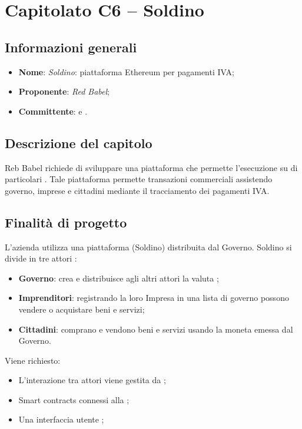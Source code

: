 \section{Capitolato C6 – Soldino}

\subsection{Informazioni generali}
% 
\begin{itemize}
\item \textbf{Nome}: \textit{Soldino}: piattaforma Ethereum per pagamenti IVA;\phantom{.}
\item \textbf{Proponente}: \textit{Red Babel};\phantom{.}
\item \textbf{Committente}: \commitNameM\mbox{} e \commitNameS.
\end{itemize}

\subsection{Descrizione del capitolo}
Reb Babel richiede di sviluppare una piattaforma che permette l'esecuzione su  di particolari .
Tale piattaforma permette transazioni commerciali assistendo governo, imprese e cittadini mediante il tracciamento dei pagamenti IVA.


\subsection{Finalità di progetto}
    L'azienda utilizza una piattaforma (Soldino) distribuita dal Governo.
    Soldino si divide in tre attori :
    \begin{itemize}
        \item \textbf{Governo}: crea e distribuisce agli altri attori la valuta ;\phantom{.}
        \item \textbf{Imprenditori}: registrando la loro Impresa in una lista di governo possono vendere o acquistare beni e servizi; \phantom{.}
        \item \textbf{Cittadini}: comprano e vendono beni e servizi usando la moneta emessa dal Governo.
    \end{itemize}
    Viene richiesto:
    \begin{itemize}
        \item L'interazione tra attori viene gestita da ;\phantom{.}
        \item Smart contracts connessi alla ;\phantom{.}
        \item Una interfaccia utente ;\phantom{.}
    \end{itemize}


